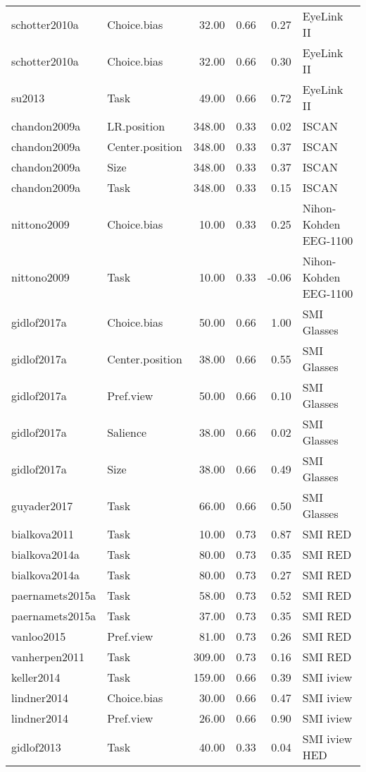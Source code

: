 \begin{table}[ht]
\begin{tabular}{llrrrl}
  schotter2010a & Choice.bias & 32.00 & 0.66 & 0.27 & EyeLink II \\ 
  schotter2010a & Choice.bias & 32.00 & 0.66 & 0.30 & EyeLink II \\ 
  su2013 & Task & 49.00 & 0.66 & 0.72 & EyeLink II \\ 
  chandon2009a & LR.position & 348.00 & 0.33 & 0.02 & ISCAN \\ 
  chandon2009a & Center.position & 348.00 & 0.33 & 0.37 & ISCAN \\ 
  chandon2009a & Size & 348.00 & 0.33 & 0.37 & ISCAN \\ 
  chandon2009a & Task & 348.00 & 0.33 & 0.15 & ISCAN \\ 
  nittono2009 & Choice.bias & 10.00 & 0.33 & 0.25 & Nihon-Kohden EEG-1100 \\ 
  nittono2009 & Task & 10.00 & 0.33 & -0.06 & Nihon-Kohden EEG-1100 \\ 
  gidlof2017a & Choice.bias & 50.00 & 0.66 & 1.00 & SMI Glasses \\ 
  gidlof2017a & Center.position & 38.00 & 0.66 & 0.55 & SMI Glasses \\ 
  gidlof2017a & Pref.view & 50.00 & 0.66 & 0.10 & SMI Glasses \\ 
  gidlof2017a & Salience & 38.00 & 0.66 & 0.02 & SMI Glasses \\ 
  gidlof2017a & Size & 38.00 & 0.66 & 0.49 & SMI Glasses \\ 
  guyader2017 & Task & 66.00 & 0.66 & 0.50 & SMI Glasses \\ 
  bialkova2011 & Task & 10.00 & 0.73 & 0.87 & SMI RED \\ 
  bialkova2014a & Task & 80.00 & 0.73 & 0.35 & SMI RED \\ 
  bialkova2014a & Task & 80.00 & 0.73 & 0.27 & SMI RED \\ 
  paernamets2015a & Task & 58.00 & 0.73 & 0.52 & SMI RED \\ 
  paernamets2015a & Task & 37.00 & 0.73 & 0.35 & SMI RED \\ 
  vanloo2015 & Pref.view & 81.00 & 0.73 & 0.26 & SMI RED \\ 
  vanherpen2011 & Task & 309.00 & 0.73 & 0.16 & SMI RED \\ 
  keller2014 & Task & 159.00 & 0.66 & 0.39 & SMI iview \\ 
  lindner2014 & Choice.bias & 30.00 & 0.66 & 0.47 & SMI iview \\ 
  lindner2014 & Pref.view & 26.00 & 0.66 & 0.90 & SMI iview \\ 
  gidlof2013 & Task & 40.00 & 0.33 & 0.04 & SMI iview HED \\ 

\end{tabular}
\end{table}

